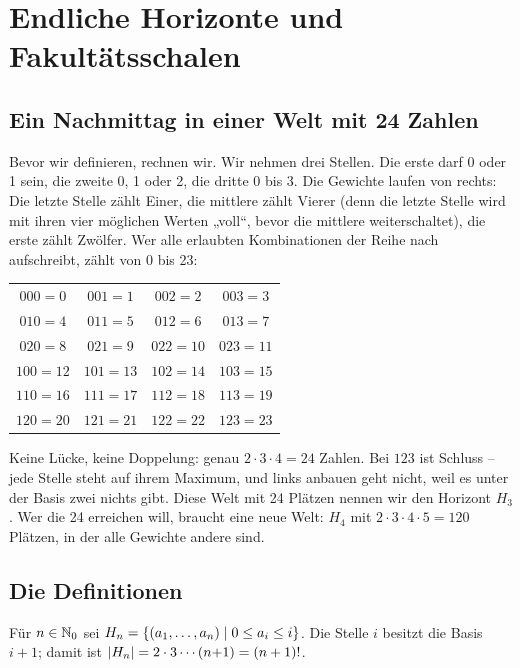 \chapter{Endliche Horizonte und Fakultätsschalen}
\label{ch:horizonte}


\section{Ein Nachmittag in einer Welt mit 24 Zahlen}

Bevor wir definieren, rechnen wir. Wir nehmen drei Stellen. Die erste
darf 0 oder 1 sein, die zweite 0, 1 oder 2, die dritte 0 bis 3. Die
Gewichte laufen von rechts: Die letzte Stelle zählt Einer, die
mittlere zählt Vierer (denn die letzte Stelle wird mit ihren vier
möglichen Werten „voll“, bevor die mittlere weiterschaltet), die
erste zählt Zwölfer. Wer alle erlaubten Kombinationen der Reihe nach
aufschreibt, zählt von 0 bis 23:

\begin{center}
\begin{tabular}{cccc}
$000=0$ & $001=1$ & $002=2$ & $003=3$\\
$010=4$ & $011=5$ & $012=6$ & $013=7$\\
$020=8$ & $021=9$ & $022=10$ & $023=11$\\
$100=12$ & $101=13$ & $102=14$ & $103=15$\\
$110=16$ & $111=17$ & $112=18$ & $113=19$\\
$120=20$ & $121=21$ & $122=22$ & $123=23$\\
\end{tabular}
\end{center}

Keine Lücke, keine Doppelung: genau $2\cdot3\cdot4=24$ Zahlen. Bei
$123$ ist Schluss -- jede Stelle steht auf ihrem Maximum, und links
anbauen geht nicht, weil es unter der Basis zwei nichts gibt. Diese
Welt mit 24 Plätzen nennen wir den Horizont $H_3$. Wer die 24
erreichen will, braucht eine neue Welt: $H_4$ mit
$2\cdot3\cdot4\cdot5=120$ Plätzen, in der alle Gewichte andere sind.

\section{Die Definitionen}

\begin{definition}
Für $n\in\mathbb N_0$ sei
$H_{n}=\{(a_1,\ldots,a_n)\mid 0\le a_i\le i\}$.
Die Stelle $i$ besitzt die Basis $i+1$; damit ist
$|H_{n}|=2\cdot3\cdots(n{+}1)=(n+1)!$.
\end{definition}

